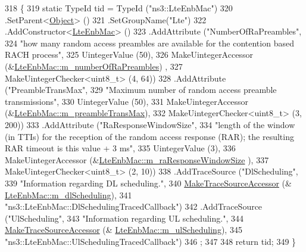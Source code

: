 \begin{DoxyCode}
318 \{
319   \textcolor{keyword}{static} TypeId tid = TypeId (\textcolor{stringliteral}{"ns3::LteEnbMac"})
320     .SetParent<\hyperlink{classns3_1_1Object_a40860402e64d8008fb42329df7097cdb}{Object}> ()
321     .SetGroupName(\textcolor{stringliteral}{"Lte"})
322     .AddConstructor<\hyperlink{classns3_1_1LteEnbMac_a4b748b18b45bfd6b0ea03b0de9810b0e}{LteEnbMac}> ()
323     .AddAttribute (\textcolor{stringliteral}{"NumberOfRaPreambles"},
324                    \textcolor{stringliteral}{"how many random access preambles are available for the contention based RACH process"},
325                    UintegerValue (50),
326                    MakeUintegerAccessor (&\hyperlink{classns3_1_1LteEnbMac_aa907c42f35e48b0c3cba70d645685342}{LteEnbMac::m\_numberOfRaPreambles})
      ,
327                    MakeUintegerChecker<uint8\_t> (4, 64))
328     .AddAttribute (\textcolor{stringliteral}{"PreambleTransMax"},
329                    \textcolor{stringliteral}{"Maximum number of random access preamble transmissions"},
330                    UintegerValue (50),
331                    MakeUintegerAccessor (&\hyperlink{classns3_1_1LteEnbMac_aa0619f1df983d20233b69ec7dac89af8}{LteEnbMac::m\_preambleTransMax}),
332                    MakeUintegerChecker<uint8\_t> (3, 200))
333     .AddAttribute (\textcolor{stringliteral}{"RaResponseWindowSize"},
334                    \textcolor{stringliteral}{"length of the window (in TTIs) for the reception of the random access response (RAR);
       the resulting RAR timeout is this value + 3 ms"},
335                    UintegerValue (3),
336                    MakeUintegerAccessor (&\hyperlink{classns3_1_1LteEnbMac_a8d651db96b6da7d09b67d6faa0e0c8a9}{LteEnbMac::m\_raResponseWindowSize}
      ),
337                    MakeUintegerChecker<uint8\_t> (2, 10))
338     .AddTraceSource (\textcolor{stringliteral}{"DlScheduling"},
339                      \textcolor{stringliteral}{"Information regarding DL scheduling."},
340                      \hyperlink{group__tracing_gab21a770b9855af4e8f69f7531ea4a6b0}{MakeTraceSourceAccessor} (&
      \hyperlink{classns3_1_1LteEnbMac_a76fc41748a5422281aa4f3d2739512b5}{LteEnbMac::m\_dlScheduling}),
341                      \textcolor{stringliteral}{"ns3::LteEnbMac::DlSchedulingTracedCallback"})
342     .AddTraceSource (\textcolor{stringliteral}{"UlScheduling"},
343                      \textcolor{stringliteral}{"Information regarding UL scheduling."},
344                      \hyperlink{group__tracing_gab21a770b9855af4e8f69f7531ea4a6b0}{MakeTraceSourceAccessor} (&
      \hyperlink{classns3_1_1LteEnbMac_aab6ec5d4fdeca697abea609fa10d7df5}{LteEnbMac::m\_ulScheduling}),
345                      \textcolor{stringliteral}{"ns3::LteEnbMac::UlSchedulingTracedCallback"})
346   ;
347 
348   \textcolor{keywordflow}{return} tid;
349 \}
\end{DoxyCode}


